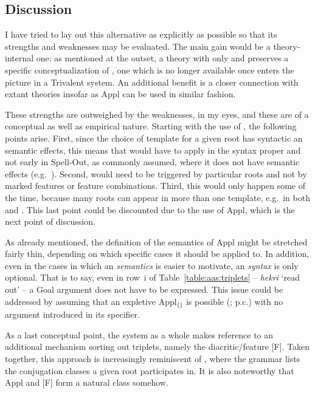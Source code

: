 \begin{exe}
\begin{xlist}
\begin{exe}
\begin{exe}
\begin{xlist}
\begin{exe}
\begin{exe}
\begin{exe}
\begin{exe}
\begin{exe}
\begin{xlist}
\begin{exe}
\begin{exe}
\begin{xlist}
\begin{exe}
\begin{xlist}
\begin{exe}
\begin{xlist}
\begin{exe}
\begin{xlist}
	\subsection{Discussion} \label{aas:jim:cons}
I have tried to lay out this alternative as explicitly as possible so that its strengths and weaknesses may be evaluated. The main gain would be a theory-internal one: as mentioned at the outset, a theory with only {\vds} and {\vzs} preserves a specific conceptualization of , one which is no longer available once  enters the picture in a Trivalent system. An additional benefit is a closer connection with extant theories insofar as Appl can be used in similar fashion.

These strengths are outweighed by the weaknesses, in my eyes, and these are of a conceptual as well as empirical nature. Starting with the use of , the following points arise. First, since the choice of template for a given root has syntactic an semantic effects, this means that  would have to apply in the syntax proper and not early in Spell-Out, as commonly assumed, where it does not have semantic effects (e.g.~\citealt{harbour03}). Second,  would need to be triggered by particular roots and not by marked features or feature combinations. Third, this would only happen some of the time, because many roots can appear in more than one template, e.g.~in both {\thif} and {\tkal}. This last point could be discounted due to the use of Appl, which is the next point of discussion.

As already mentioned, the definition of the semantics of Appl might be stretched fairly thin, depending on which specific cases it should be applied to. In addition, even in the cases in which an  \emph{semantics} is easier to motivate, an  \emph{syntax} is only optional. That is to say, even in row~i of Table~\ref{table:aas:triplets} -- \emph{hekri} `read out' -- a Goal argument does not have to be expressed. This issue could be addressed by assuming that an expletive Appl$_{\text{\{\}}}$ is possible (\citealt{wood15springer}; p.c.) with no argument introduced in its specifier.

As a last conceptual point, the system as a whole makes reference to an additional mechanism sorting out triplets, namely the diacritic/feature [F]. Taken together, this approach is increasingly reminiscent of \cite{arad05}, where the grammar lists the conjugation classes a given root participates in. It is also noteworthy that Appl and [F] form a natural class somehow. 


\end{xlist}
\end{exe}
\end{xlist}
\end{exe}
\end{xlist}
\end{exe}
\end{xlist}
\end{exe}
\end{exe}
\end{xlist}
\end{exe}
\end{exe}
\end{exe}
\end{exe}
\end{exe}
\end{xlist}
\end{exe}
\end{exe}
\end{xlist}
\end{exe}
